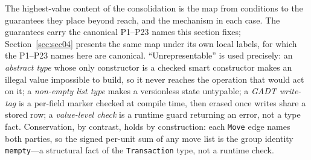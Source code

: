 The highest-value content of the consolidation is the map from conditions to the guarantees they place beyond reach, and the mechanism in each case. The guarantees carry the canonical P1--P23 names this section fixes; Section~\ref{sec:sec04} presents the same map under its own local labels, for which the P1--P23 names here are canonical. ``Unrepresentable'' is used precisely: an \emph{abstract type} whose only constructor is a checked smart constructor makes an illegal value impossible to build, so it never reaches the operation that would act on it; a \emph{non-empty list type} makes a versionless state untypable; a \emph{GADT write-tag} is a per-field marker checked at compile time, then erased once writes share a stored row; a \emph{value-level check} is a runtime guard returning an error, not a type fact. Conservation, by contrast, holds by construction: each \texttt{Move} edge names both parties, so the signed per-unit sum of any move list is the group identity \texttt{mempty}---a structural fact of the \texttt{Transaction} type, not a runtime check.

